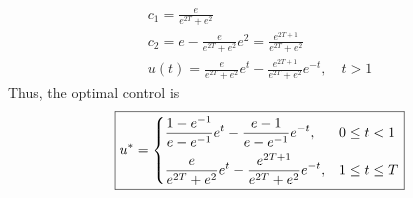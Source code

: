 \documentclass[letterpaper,11pt,titlepage]{article}
\begin{document}
\begin{enumerate}[leftmargin=0pt]
\begin{gather}
    c_1 = \frac{e}{e^{2T} + e^2} \\
    c_2 = e - \frac{e}{e^{2T} + e^2} e^2 = \frac{e^{2T+1}}{e^{2T} + e^2} \\
    u(t) = \frac{e}{e^{2T} + e^2} e^t - \frac{e^{2T+1}}{e^{2T} + e^2} e^{-t}, \quad t>1
  \end{gather}
  Thus, the optimal control is
  \begin{gather}
    \boxed{u^* = \begin{dcases}
        \frac{1-e^{-1}}{e - e^{-1}} e^t - \frac{e - 1}{e - e^{-1}} e^{-t}, & 0\le t < 1 \\
        \frac{e}{e^{2T} + e^2} e^t - \frac{e^{2T+1}}{e^{2T} + e^2} e^{-t}, & 1\le t\le T
      \end{dcases}}
  \end{gather}


\end{enumerate}
\end{document}
